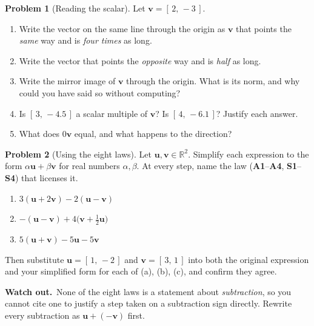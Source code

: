 \documentclass[11pt]{article}
\theoremstyle{definition}
\newtheorem{prob}{Problem}[section]
\newcommand{\heads}[1]{\par\smallskip\noindent
  {\small\sffamily\textcolor{BrickRed}{\textbf{Watch out.}}\ #1}\par\smallskip}
\newcommand{\R}{\mathbb{R}}
\newcommand{\vc}[1]{\mathbf{#1}}
\begin{document}
\begin{prob}[Reading the scalar]
Let $\vc{v}=[\,2,\,-3\,]$.

\begin{enumerate}[label=\textbf{(\alph*)},leftmargin=2.6em,itemsep=7pt,topsep=6pt]
  \item Write the vector on the same line through the origin as $\vc{v}$ that
        points the \emph{same} way and is \emph{four times} as long.
  \item Write the vector that points the \emph{opposite} way and is \emph{half}
        as long.
  \item Write the mirror image of $\vc{v}$ through the origin. What is its norm,
        and why could you have said so without computing?
  \item Is $[\,3,\,-4.5\,]$ a scalar multiple of $\vc{v}$? Is
        $[\,4,\,-6.1\,]$? Justify each answer.
  \item What does $0\vc{v}$ equal, and what happens to the direction?
\end{enumerate}
\end{prob}

\begin{prob}[Using the eight laws]
Let $\vc{u},\vc{v}\in\R^{2}$. Simplify each expression to the form
$\alpha\vc{u}+\beta\vc{v}$ for real numbers $\alpha,\beta$. At every step, name
the law (\textbf{A1}--\textbf{A4}, \textbf{S1}--\textbf{S4}) that licenses it.

\begin{enumerate}[label=\textbf{(\alph*)},leftmargin=2.6em,itemsep=7pt,topsep=6pt]
  \item $3(\vc{u}+2\vc{v}) - 2(\vc{u}-\vc{v})$
  \item $-(\vc{u}-\vc{v}) + 4\bigl(\vc{v}+\tfrac12\vc{u}\bigr)$
  \item $5(\vc{u}+\vc{v}) - 5\vc{u} - 5\vc{v}$
\end{enumerate}

\noindent Then substitute $\vc{u}=[\,1,\,-2\,]$ and $\vc{v}=[\,3,\,1\,]$ into
both the original expression and your simplified form for each of (a), (b), (c),
and confirm they agree.

\heads{None of the eight laws is a statement about \emph{subtraction}, so you
cannot cite one to justify a step taken on a subtraction sign directly. Rewrite
every subtraction as $\vc{u}+(-\vc{v})$ first.}
\end{prob}
\end{document}
